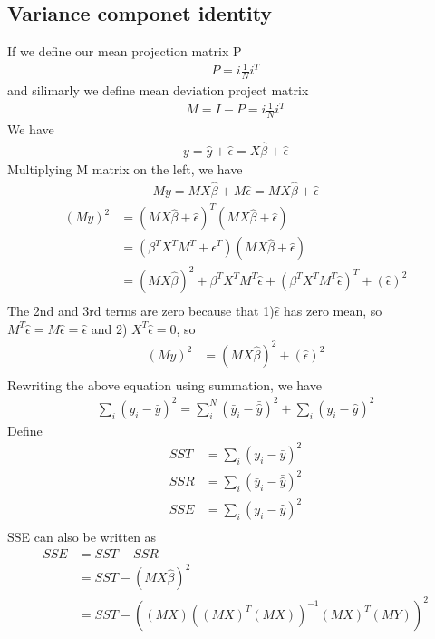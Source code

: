 \documentclass[a4paper]{article}
\begin{document}
\subsection{Variance componet identity}
If we define our mean projection matrix P 
\begin{align*}
P = i \frac{1}{N}i^T
\end{align*}
and silimarly we define mean deviation project matrix 
\begin{align*}
M= I-P = i\frac{1}{N}i^T
\end{align*}
We have
\begin{align*}
y= \hat y + \hat \epsilon = X\hat \beta + \hat \epsilon
\end{align*}
Multiplying M matrix on the left, we have
\begin{align*}
My= MX\hat \beta + M \hat \epsilon = MX\hat \beta +\hat \epsilon
\end{align*}
\begin{align*}
(My)^2 &= (MX\hat \beta + \hat \epsilon)^T(MX\hat \beta +  \hat \epsilon) \\
&=(\beta^T X^T M^T + \hat \epsilon^T )(MX\hat \beta + \hat \epsilon) \\
&=(MX\hat \beta)^2 + \beta^T X^T M^T \hat \epsilon+ (\beta^T X^T M^T \hat \epsilon)^T  + (\hat \epsilon)^2\\
\end{align*}
The 2nd and 3rd terms are zero because that 1)$\hat \epsilon$ has zero mean, so $M^T\hat \epsilon = M \hat \epsilon = \hat \epsilon$ and 2) $X^T\hat \epsilon = 0$, so
\begin{align*}
(My)^2 &=(MX\hat \beta)^2 + (\hat \epsilon)^2\\
\end{align*}
Rewriting the above equation using summation, we have
\begin{align*}
\sum_i (y_i - \bar y)^2 =\sum_i^N (\bar y_i - \bar {\hat y})^2 + \sum_i(y_i-\hat y)^2
\end{align*}
Define
\begin{align*}
SST & = \sum_i (y_i - \bar y)^2 \\
SSR & = \sum_i (\bar y_i - \bar {\hat y})^2 \\
SSE & = \sum_i(y_i-\hat y)^2\\
\end{align*}
SSE can also be written as
\begin{align*}
SSE & = SST- SSR\\
      & = SST - (MX\hat \beta)^2\\
      & = SST - ((MX)((MX)^T(MX))^{-1}(MX)^T(MY))^2 
\end{align*}
\end{document}
